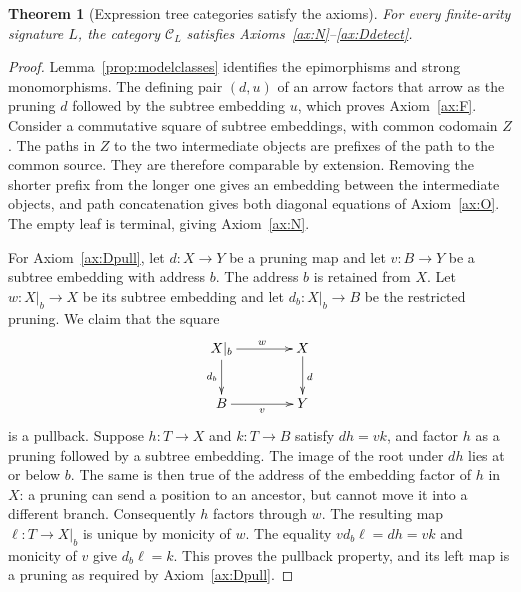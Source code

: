 \documentclass[11pt,a4paper]{article}
\theoremstyle{plain}
\newtheorem{theorem}{Theorem}[section]
\theoremstyle{definition}
\theoremstyle{remark}
\newcommand{\C}{\mathcal C}
\begin{document}
\begin{theorem}[Expression tree categories satisfy the axioms]\label{thm:realization}
For every finite-arity signature $L$, the category $\C_L$ satisfies
Axioms~\mbox{\ref{ax:N}--\ref{ax:Ddetect}}.
\end{theorem}
\begin{proof}

Lemma~\ref{prop:modelclasses} identifies the epimorphisms
and strong monomorphisms. The defining pair $(d,u)$ of an arrow
factors that arrow as the pruning $d$ followed by the subtree
embedding $u$, which proves Axiom~\ref{ax:F}.
Consider a commutative square of subtree embeddings, with common
codomain $Z$. The paths in $Z$ to the two intermediate objects are
prefixes of the path to the common source. They are therefore
comparable by extension. Removing the shorter prefix from the longer
one gives an embedding between the intermediate objects, and path
concatenation gives both diagonal equations of Axiom~\ref{ax:O}.
The empty leaf is terminal, giving Axiom~\ref{ax:N}.

For Axiom~\ref{ax:Dpull}, let $d:X\to Y$ be a pruning map
and let $v:B\to Y$ be a subtree embedding with address $b$. The address $b$ is
retained from $X$. Let $w:X|_b\to X$ be its subtree embedding and let
$d_b:X|_b\to B$ be the restricted pruning. We claim that the square
\[
 \xymatrix@C=4em@R=2.5em{
X|_b\ar[r]^w\ar[d]_{d_b}&X\ar[d]^d\\
B\ar[r]_v&Y
 }
\]
is a pullback. Suppose $h:T\to X$ and $k:T\to B$ satisfy
$dh=vk$, and factor $h$ as a pruning followed by a subtree embedding.
The image of the root under $dh$ lies at or below $b$. The same
is then true of the address of the embedding factor of $h$ in $X$:
a pruning can send a position to an ancestor, but cannot move it
into a different branch. Consequently $h$ factors through $w$.
The resulting map $\ell:T\to X|_b$ is unique by monicity of $w$.
The equality $vd_b\ell=dh=vk$ and monicity of $v$ give
$d_b\ell=k$. This proves the pullback property, and its left map
is a pruning as required by Axiom~\ref{ax:Dpull}.


\end{proof}
\end{document}
